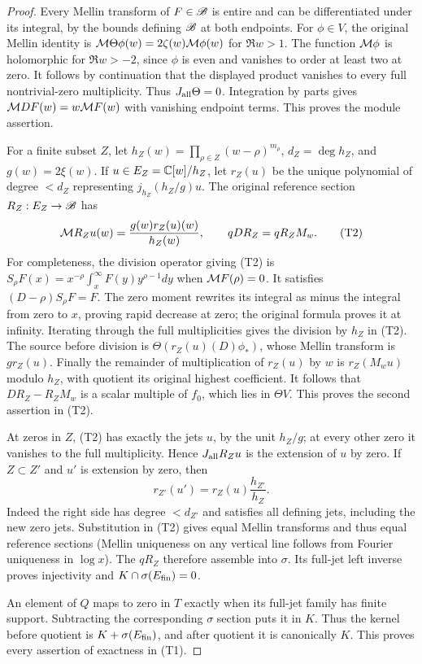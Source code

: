 \documentclass[11pt]{article}
\begin{document}
\begin{proof}
Every Mellin transform of $F\in\mathscr B$ is entire and can be differentiated
under its integral, by the bounds defining $\mathscr B$ at both endpoints.
For $\phi\in V$, the original Mellin identity is
$\mathcal M\Theta\phi(w)=2\zeta(w)\mathcal M\phi(w)$ for $\Re w>1$.
The function $\mathcal M\phi$ is holomorphic for $\Re w>-2$, since $\phi$
is even and vanishes to order at least two at zero. It follows by
continuation that the displayed product vanishes to every full
nontrivial-zero multiplicity. Thus $J_{\rm all}\Theta=0$.
Integration by parts gives $\mathcal M DF(w)=w\mathcal M F(w)$ with vanishing endpoint
terms. This proves the module assertion.

For a finite subset $Z$, let
$h_Z(w)=\prod_{\rho\in Z}(w-\rho)^{m_\rho}$, $d_Z=\deg h_Z$, and
$g(w)=2\xi(w)$. If $u\in E_Z=\mathbb C[w]/h_Z$, let $r_Z(u)$ be the
unique polynomial of degree $<d_Z$ representing $j_{h_Z}(h_Z/g)u$.
The original reference section $R_Z:E_Z\to\mathscr B$ has
\[
 \mathcal M R_Zu(w)=\frac{g(w)r_Z(u)(w)}{h_Z(w)},\qquad
 qDR_Z=qR_ZM_w.\tag{T2}
\]
For completeness, the division operator giving (T2) is
$S_\rho F(x)=x^{-\rho}\int_x^\infty F(y)y^{\rho-1}dy$ when
$\mathcal M F(\rho)=0$. It satisfies $(D-\rho)S_\rho F=F$.
The zero moment rewrites its integral as minus the integral from zero
to $x$, proving rapid decrease at zero; the original formula proves it
at infinity. Iterating through the full multiplicities gives the
division by $h_Z$ in (T2). The source before division is
$\Theta(r_Z(u)(D)\phi_*)$, whose Mellin transform is $g r_Z(u)$.
Finally the remainder of multiplication of $r_Z(u)$ by $w$ is
$r_Z(M_wu)$ modulo $h_Z$, with quotient its original highest coefficient.
It follows that $DR_Z-R_ZM_w$ is a scalar multiple of $f_0$,
which lies in $\Theta V$. This proves the second assertion in (T2).

At zeros in $Z$, (T2) has exactly the jets $u$, by the unit $h_Z/g$;
at every other zero it vanishes to the full multiplicity. Hence
$J_{\rm all}R_Zu$ is the extension of $u$ by zero.
If $Z\subset Z'$ and $u'$ is extension by zero, then
\[
 r_{Z'}(u')=r_Z(u)\frac{h_{Z'}}{h_Z}.
\]
Indeed the right side has degree $<d_{Z'}$ and satisfies all defining
jets, including the new zero jets. Substitution in (T2) gives equal
Mellin transforms and thus equal reference sections (Mellin uniqueness
on any vertical line follows from Fourier uniqueness in $\log x$).
The $qR_Z$ therefore assemble into $\sigma$. Its full-jet left inverse
proves injectivity and $K\cap\sigma(E_{\rm fin})=0$.

An element of $Q$ maps to zero in $T$ exactly when its full-jet family
has finite support. Subtracting the corresponding $\sigma$ section
puts it in $K$. Thus the kernel before quotient is
$K+\sigma(E_{\rm fin})$, and after quotient it is canonically $K$.
This proves every assertion of exactness in (T1).


\end{proof}
\end{document}
